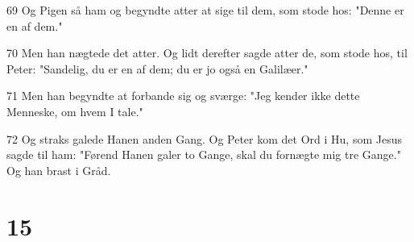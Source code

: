 \par 69 Og Pigen så ham og begyndte atter at sige til dem, som stode hos: "Denne er en af dem."
\par 70 Men han nægtede det atter. Og lidt derefter sagde atter de, som stode hos, til Peter: "Sandelig, du er en af dem; du er jo også en Galilæer."
\par 71 Men han begyndte at forbande sig og sværge: "Jeg kender ikke dette Menneske, om hvem I tale."
\par 72 Og straks galede Hanen anden Gang. Og Peter kom det Ord i Hu, som Jesus sagde til ham: "Førend Hanen galer to Gange, skal du fornægte mig tre Gange." Og han brast i Gråd.

\chapter{15}

